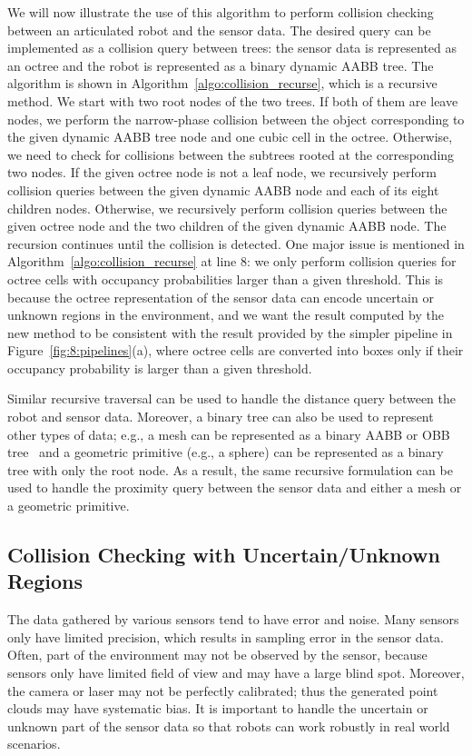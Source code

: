 We will now illustrate the use of this algorithm to perform collision
checking between an articulated
robot and the sensor data. The desired query can be implemented as a collision
query between trees: the sensor data is represented as an octree and
the robot is represented as a binary dynamic AABB tree. The algorithm
is shown in Algorithm~\ref{algo:collision_recurse}, which is a
recursive method. We start with two root nodes of the two trees. If
both of them are leave nodes, we perform the narrow-phase collision
between the object corresponding to the given dynamic AABB tree node
and one cubic cell in the octree. Otherwise, we need to check for
collisions between the subtrees rooted at the corresponding two nodes. If the
given octree node is not a leaf node, we recursively perform collision queries
between the given dynamic AABB
node and each of its eight children nodes. Otherwise, we recursively perform collision queries between the given
octree node and the two children of the given dynamic AABB node. The
recursion continues until the collision is detected. One major issue is mentioned in Algorithm~\ref{algo:collision_recurse} at line $8$: we only perform
collision queries for octree cells with occupancy probabilities larger than a
given threshold. This is because the octree representation of the sensor data can encode uncertain or
unknown regions in the environment, and we want the result computed by
the new method to be consistent with the result provided by the simpler
pipeline in Figure~\ref{fig:8:pipelines}(a), where octree cells are
converted into boxes only if their occupancy probability is larger
than a given threshold.

Similar recursive traversal can be used to handle the distance
query between the robot and sensor data. Moreover, a binary tree
can also be used to represent other types of data; e.g., a mesh can be
represented as a binary AABB or OBB tree~\cite{Pan:ICRA:2012} and a
geometric primitive (e.g., a sphere) can be represented as a binary
tree with only the root node. As a result, the same recursive formulation can be used to handle the proximity query between the sensor data and
either a mesh or a geometric primitive.


\subsection{Collision Checking with Uncertain/Unknown Regions}
The data gathered by various sensors tend to have error and noise.
Many sensors only have limited precision, which results in sampling
error in the sensor data. Often, part of the environment may not be
observed by the sensor, because sensors only have limited field of
view and may have a large blind spot. Moreover, the camera or laser
may not be perfectly calibrated; thus the generated point clouds
may have systematic bias. It is important to handle the uncertain or
unknown part of the sensor data so that robots can work robustly in
real world scenarios.

